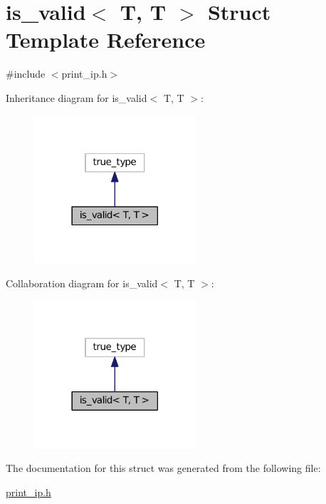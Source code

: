 \hypertarget{structis__valid_3_01T_00_01T_01_4}{}\section{is\+\_\+valid$<$ T, T $>$ Struct Template Reference}
\label{structis__valid_3_01T_00_01T_01_4}


{\ttfamily \#include $<$print\+\_\+ip.\+h$>$}



Inheritance diagram for is\+\_\+valid$<$ T, T $>$\+:
\nopagebreak
\begin{figure}[H]
\begin{center}
\leavevmode
\includegraphics[width=170pt]{structis__valid_3_01T_00_01T_01_4__inherit__graph}
\end{center}
\end{figure}


Collaboration diagram for is\+\_\+valid$<$ T, T $>$\+:
\nopagebreak
\begin{figure}[H]
\begin{center}
\leavevmode
\includegraphics[width=170pt]{structis__valid_3_01T_00_01T_01_4__coll__graph}
\end{center}
\end{figure}


The documentation for this struct was generated from the following file\+:\begin{DoxyCompactItemize}
\item 
\hyperlink{print__ip_8h}{print\+\_\+ip.\+h}\end{DoxyCompactItemize}
